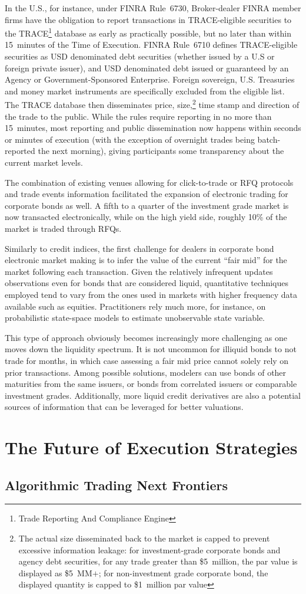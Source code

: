 In the U.S., for instance, under FINRA Rule~6730, Broker-dealer FINRA member firms have the obligation to report transactions in TRACE-eligible securities to the TRACE\footnote{Trade Reporting And Compliance Engine} database as early as practically possible, but no later than within 15~minutes of the Time of Execution. FINRA Rule~6710 defines TRACE-eligible securities as USD denominated debt securities (whether issued by a U.S or foreign private issuer), and USD denominated debt issued or guaranteed by an Agency or Government-Sponsored Enterprise. Foreign sovereign, U.S. Treasuries and money market instruments are specifically excluded from the eligible list. The TRACE database then disseminates price, size,\footnote{The actual size disseminated back to the market is capped to prevent excessive information leakage: for investment-grade corporate bonds and agency debt securities, for any trade greater than \$5~million, the par value is displayed as \$5~MM$+$; for non-investment grade corporate bond, the displayed quantity is capped to \$1~million par value} time stamp and direction of the trade to the public. While the rules require reporting in no more than 15~minutes, most reporting and public dissemination now happens within seconds or minutes of execution (with the exception of overnight trades being batch-reported the next morning), giving participants some transparency about the current market levels.


The combination of existing venues allowing for click-to-trade or RFQ protocols and trade events information facilitated the expansion of electronic trading for corporate bonds as well. A fifth to a quarter of the investment grade market is now transacted electronically, while on the high yield side, roughly 10\% of the market is traded through RFQs.


Similarly to credit indices, the first challenge for dealers in corporate bond electronic market making is to infer the value of the current ``fair mid'' for the market following each transaction. Given the relatively infrequent updates observations even for bonds that are considered liquid, quantitative techniques employed tend to vary from the ones used in markets with higher frequency data available such as equities. Practitioners rely much more, for instance, on probabilistic state-space models to estimate unobservable state variable.


This type of approach obviously becomes increasingly more challenging as one moves down the liquidity spectrum. It is not uncommon for illiquid bonds to not trade for months, in which case assessing a fair mid price cannot solely rely on prior transactions. Among possible solutions, modelers can use bonds of other maturities from the same issuers, or bonds from correlated issuers or comparable investment grades. Additionally, more liquid credit derivatives are also a potential sources of information that can be leveraged for better valuations. 



\section{The Future of Execution Strategies}
\subsection{Algorithmic Trading Next Frontiers}